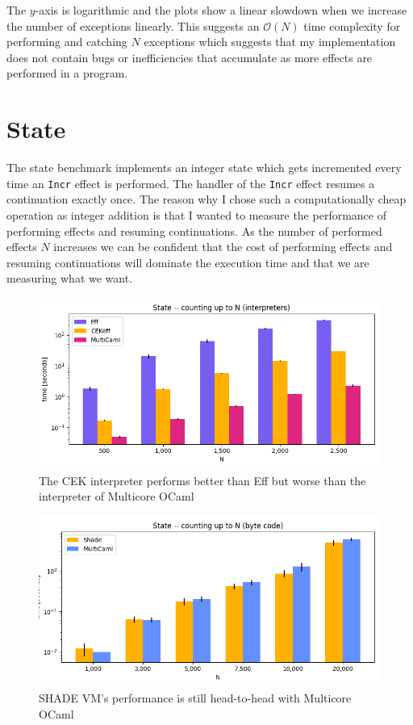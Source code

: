 \documentclass[class=article, crop=false]{standalone}
\begin{document}
The $y$-axis is logarithmic and the plots show a linear slowdown when we
increase the number of exceptions linearly. This suggests an $\mathcal{O}(N)$
time complexity for performing and catching $N$ exceptions which suggests that
my implementation does not contain bugs or inefficiencies that accumulate
as more effects are performed in a program.

\section{State}

The state benchmark implements an integer state which gets incremented every
time an \verb|Incr| effect is performed. The handler of the \verb|Incr| effect
resumes a continuation exactly once. The reason why I chose such a 
computationally cheap operation as integer addition is that I wanted to measure
the performance of performing effects and resuming continuations. As the number
of performed effects $N$ increases we can be confident that the cost of
performing effects and resuming continuations will dominate the execution time
and that we are measuring what we want.

\begin{figure}
    \centering
    \includegraphics[width=.8\linewidth]{eval_plots/interp_state.png}

    \caption{The CEK interpreter performs better than Eff but worse than the interpreter of Multicore OCaml}
    \label{fig:state-interpreters}
\end{figure}

\begin{figure}
    \centering
    \includegraphics[width=.7\linewidth]{eval_plots/comp_state.png}

    \caption{SHADE VM's performance is still head-to-head with Multicore OCaml}
    \label{fig:state-bytecode}
\end{figure}
\end{document}

